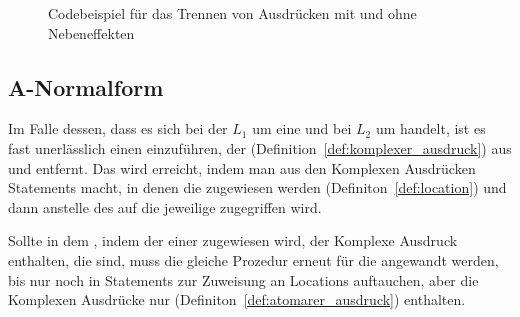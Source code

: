 \begin{figure}[H]
  \hfill

  \caption{Codebeispiel für das Trennen von Ausdrücken mit und ohne Nebeneffekten}
  \label{fig:example_remove_complex_operands}
\end{figure}

\subsection{A-Normalform}
\label{sec:a_normalform}

Im Falle dessen, dass es sich bei der  $L_1$ um eine  und bei $L_2$ um  handelt, ist es fast unerlässlich einen  einzuführen, der  (Definition~\ref{def:komplexer_ausdruck}) aus  und  entfernt. Das wird erreicht, indem man aus den Komplexen Ausdrücken  Statements macht, in denen die   zugewiesen werden (Definiton~\ref{def:location}) und dann anstelle des  auf die jeweilige  zugegriffen wird.

Sollte in dem , indem der  einer  zugewiesen wird, der Komplexe Ausdruck  enthalten, die  sind, muss die gleiche Prozedur erneut für die  angewandt werden, bis  nur noch in Statements zur Zuweisung an Locations auftauchen, aber die Komplexen Ausdrücke nur  (Definiton~\ref{def:atomarer_ausdruck}) enthalten.

